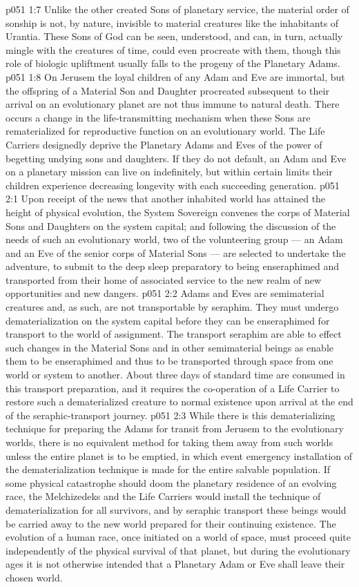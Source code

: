 \vs p051 1:7 Unlike the other created Sons of planetary service, the material order of sonship is not, by nature, invisible to material creatures like the inhabitants of Urantia. These Sons of God can be seen, understood, and can, in turn, actually mingle with the creatures of time, could even procreate with them, though this role of biologic upliftment usually falls to the progeny of the Planetary Adams.
\vs p051 1:8 \pc On Jerusem the loyal children of any Adam and Eve are immortal, but the offspring of a Material Son and Daughter procreated subsequent to their arrival on an evolutionary planet are not thus immune to natural death. There occurs a change in the life\hyp{}transmitting mechanism when these Sons are rematerialized for reproductive function on an evolutionary world. The Life Carriers designedly deprive the Planetary Adams and Eves of the power of begetting undying sons and daughters. If they do not default, an Adam and Eve on a planetary mission can live on indefinitely, but within certain limits their children experience decreasing longevity with each succeeding generation.
\vs p051 2:1 Upon receipt of the news that another inhabited world has attained the height of physical evolution, the System Sovereign convenes the corps of Material Sons and Daughters on the system capital; and following the discussion of the needs of such an evolutionary world, two of the volunteering group --- an Adam and an Eve of the senior corps of Material Sons --- are selected to undertake the adventure, to submit to the deep sleep preparatory to being enseraphimed and transported from their home of associated service to the new realm of new opportunities and new dangers.
\vs p051 2:2 Adams and Eves are semimaterial creatures and, as such, are not transportable by seraphim. They must undergo dematerialization on the system capital before they can be enseraphimed for transport to the world of assignment. The transport seraphim are able to effect such changes in the Material Sons and in other semimaterial beings as enable them to be enseraphimed and thus to be transported through space from one world or system to another. About three days of standard time are consumed in this transport preparation, and it requires the co\hyp{}operation of a Life Carrier to restore such a dematerialized creature to normal existence upon arrival at the end of the seraphic\hyp{}transport journey.
\vs p051 2:3 \pc While there is this dematerializing technique for preparing the Adams for transit from Jerusem to the evolutionary worlds, there is no equivalent method for taking them away from such worlds unless the entire planet is to be emptied, in which event emergency installation of the dematerialization technique is made for the entire salvable population. If some physical catastrophe should doom the planetary residence of an evolving race, the Melchizedeks and the Life Carriers would install the technique of dematerialization for all survivors, and by seraphic transport these beings would be carried away to the new world prepared for their continuing existence. The evolution of a human race, once initiated on a world of space, must proceed quite independently of the physical survival of that planet, but during the evolutionary ages it is not otherwise intended that a Planetary Adam or Eve shall leave their chosen world.
